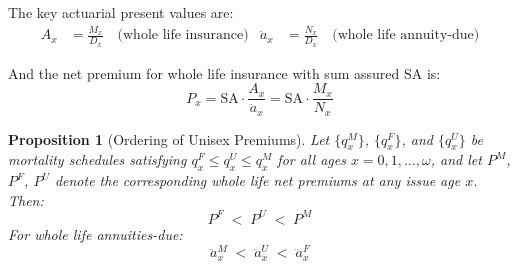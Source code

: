 \documentclass[12pt,a4paper]{article}
\newtheorem{proposition}[definition]{Proposition}
\newcommand{\qx}[1]{q_{#1}}
\newcommand{\Dx}[1]{D_{#1}}
\newcommand{\Nx}[1]{N_{#1}}
\newcommand{\Mx}[1]{M_{#1}}
\newcommand{\Ax}[1]{A_{#1}}
\newcommand{\ax}[1]{\ddot{a}_{#1}}
\newcommand{\SA}{\text{SA}}
\begin{document}
The key actuarial present values are:
\begin{align}
  \Ax{x} &= \frac{\Mx{x}}{\Dx{x}} \quad \text{(whole life insurance)} &
  \ax{x} &= \frac{\Nx{x}}{\Dx{x}} \quad \text{(whole life annuity-due)}
\end{align}

And the net premium for whole life insurance with sum assured $\SA$ is:
\begin{equation}
\label{eq:whole-life-premium}
  P_x = \SA \cdot \frac{\Ax{x}}{\ax{x}} = \SA \cdot \frac{\Mx{x}}{\Nx{x}}
\end{equation}

\begin{proposition}[Ordering of Unisex Premiums]
\label{prop:direction}
Let $\{\qx{x}^M\}$, $\{\qx{x}^F\}$, and $\{\qx{x}^U\}$ be mortality schedules
satisfying $\qx{x}^F \leq \qx{x}^U \leq \qx{x}^M$ for all ages $x = 0, 1,
\ldots, \omega$, and let $P^M$, $P^F$, $P^U$ denote the corresponding whole
life net premiums at any issue age $x$. Then:
\begin{equation}
  P^F \;<\; P^U \;<\; P^M
\end{equation}
For whole life annuities-due:
\begin{equation}
  \ax{x}^M \;<\; \ax{x}^U \;<\; \ax{x}^F
\end{equation}
\end{proposition}
\end{document}
